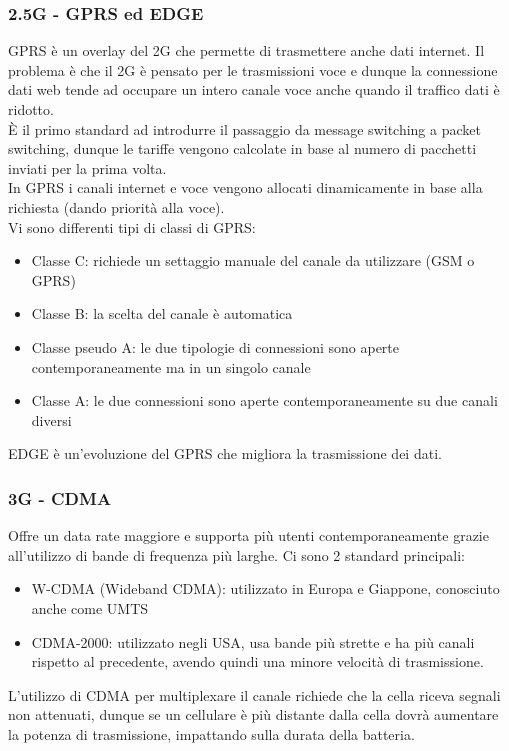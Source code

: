 \documentclass[10pt,a4paper,twoside]{article}
\begin{document}
\subsubsection{2.5G - GPRS ed EDGE}
GPRS è un overlay del 2G che permette di trasmettere anche dati internet. Il problema è che il 2G è pensato per le trasmissioni voce e dunque la connessione dati web tende ad occupare un intero canale voce anche quando il traffico dati è ridotto.\\
È il primo standard ad introdurre il passaggio da message switching a packet switching, dunque le tariffe vengono calcolate in base al numero di pacchetti inviati per la prima volta.\\
In GPRS i canali internet e voce vengono allocati dinamicamente in base alla richiesta (dando priorità alla voce).\\
Vi sono differenti tipi di classi di GPRS:
\begin{itemize}
\item Classe C: richiede un settaggio manuale del canale da utilizzare (GSM o GPRS)
\item Classe B: la scelta del canale è automatica
\item Classe pseudo A: le due tipologie di connessioni sono aperte contemporaneamente ma in un singolo canale
\item Classe A: le due connessioni sono aperte contemporaneamente su due canali diversi
\end{itemize}
EDGE è un'evoluzione del GPRS che migliora la trasmissione dei dati.

\subsubsection{3G - CDMA}
Offre un data rate maggiore e supporta più utenti contemporaneamente grazie all'utilizzo di bande di frequenza più larghe. Ci sono 2 standard principali:
\begin{itemize}
\item W-CDMA (Wideband CDMA): utilizzato in Europa e Giappone, conosciuto anche come UMTS
\item CDMA-2000: utilizzato negli USA, usa bande più strette e ha più canali rispetto al precedente, avendo quindi una minore velocità di trasmissione.
\end{itemize}
L'utilizzo di CDMA per multiplexare il canale richiede che la cella riceva segnali non attenuati, dunque se un cellulare è più distante dalla cella dovrà aumentare la potenza di trasmissione, impattando sulla durata della batteria.
\end{document}
